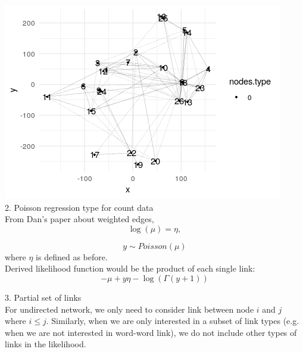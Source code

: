 \documentclass{article}
\begin{document}
\includegraphics[scale=1]{classroom_t4.png}
\\
2. Poisson regression type for count data\\
From Dan's paper about weighted edges,
$$
\log (\mu) = \eta,$$

$$
y \sim Poisson(\mu)
$$
where $\eta$ is defined as before. \\
Derived likelihood function would be the product of each single link:
$$
-\mu + y \eta - \log(\Gamma(y+1))
$$

3. Partial set of links\\
For undirected network, we only need to consider link between node $i$ and $j$ where $i \leq j$. Similarly, when we are only interested in a subset of link types (e.g. when we are not interested in word-word link), we do not include other types of links in the likelihood.
\end{document}
